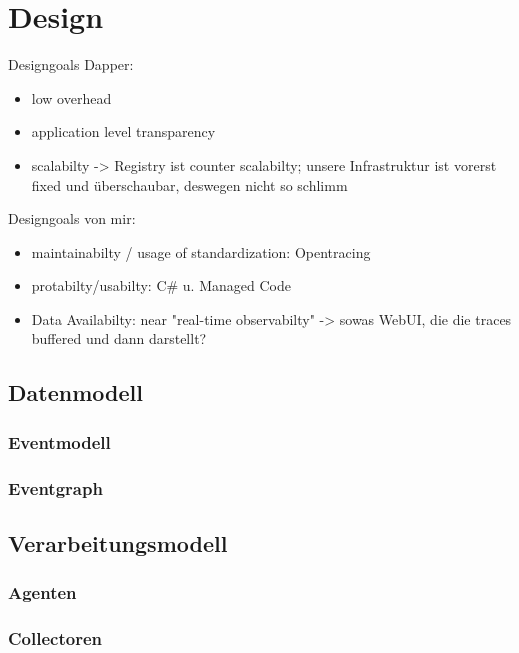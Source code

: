 %

\chapter{Design}

Designgoals Dapper:
\begin{itemize}
	\item low overhead
	\item application level transparency
	\item scalabilty -> Registry ist counter scalabilty; unsere Infrastruktur ist vorerst fixed und überschaubar, deswegen nicht so schlimm
\end{itemize}
Designgoals von mir:
\begin{itemize}
	\item maintainabilty / usage of standardization: Opentracing
	\item protabilty/usabilty: C\# u. Managed Code
	\item Data Availabilty: near "real-time observabilty" -> sowas WebUI, die die traces buffered und dann darstellt?
\end{itemize}
\label{chapter:Design}
\section{Datenmodell}
\label{section:Datenmodell}
\subsection{Eventmodell}
\label{subsection:Eventmodell}
\subsection{Eventgraph}
\label{subsection:Eventgraph}
\section{Verarbeitungsmodell}
\label{section:Verarbeitungsmodell}
\subsection{Agenten}
\label{subsection:Agenten}
\subsection{Collectoren}
\label{subsection:Collectoren}

